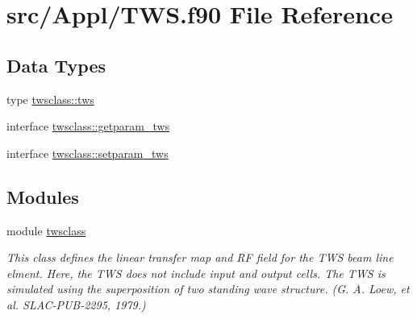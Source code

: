 \hypertarget{_t_w_s_8f90}{}\section{src/\+Appl/\+T\+WS.f90 File Reference}
\label{_t_w_s_8f90}
\subsection*{Data Types}
\begin{DoxyCompactItemize}
\item 
type \mbox{\hyperlink{namespacetwsclass_structtwsclass_1_1tws}{twsclass\+::tws}}
\item 
interface \mbox{\hyperlink{interfacetwsclass_1_1getparam__tws}{twsclass\+::getparam\+\_\+tws}}
\item 
interface \mbox{\hyperlink{interfacetwsclass_1_1setparam__tws}{twsclass\+::setparam\+\_\+tws}}
\end{DoxyCompactItemize}
\subsection*{Modules}
\begin{DoxyCompactItemize}
\item 
module \mbox{\hyperlink{namespacetwsclass}{twsclass}}
\begin{DoxyCompactList}\small\item\em This class defines the linear transfer map and RF field for the T\+WS beam line elment. Here, the T\+WS does not include input and output cells. The T\+WS is simulated using the superposition of two standing wave structure. (G. A. Loew, et al. S\+L\+A\+C-\/\+P\+U\+B-\/2295, 1979.) \end{DoxyCompactList}\end{DoxyCompactItemize}
